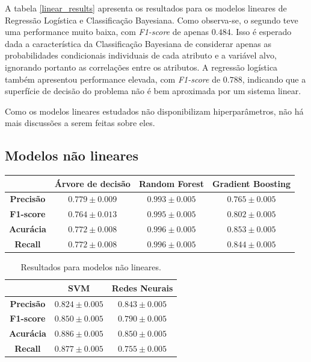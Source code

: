 \documentclass{homework}
\begin{document}
A tabela \ref{linear_results} apresenta os resultados para os modelos lineares de Regressão Logística e Classificação
Bayesiana. Como observa-se, o segundo teve uma performance muito baixa, com \textit{F1-score} de apenas $0.484$.
Isso é esperado dada a característica da Classificação Bayesiana de considerar apenas as probabilidades condicionais
individuais de cada atributo e a variável alvo, ignorando portanto as correlações entre os atributos. A regressão
logística também apresentou performance elevada, com \textit{F1-score} de $0.788$, indicando que a superfície de decisão
do problema não é bem aproximada por um sistema linear.

Como os modelos lineares estudados não disponibilizam hiperparâmetros, não há mais discussões a serem feitas sobre eles.

\subsection{Modelos não lineares}

\begin{table}[h!]
    \centering
    \begin{tabular}{|c|c|c|c|}
        \hline
            & \textbf{Árvore de decisão} & \textbf{Random Forest} & \textbf{Gradient Boosting} \\
        \hline
        \textbf{Precisão} & $0.779 \pm 0.009$ & $0.993 \pm 0.005$ & $0.765 \pm 0.005$ \\
        \hline
        \textbf{F1-score} & $0.764 \pm 0.013$ & $0.995 \pm 0.005$ & $0.802 \pm 0.005$ \\
        \hline
        \textbf{Acurácia} & $0.772 \pm 0.008$ & $0.996 \pm 0.005$ & $0.853 \pm 0.005$ \\
        \hline
        \textbf{Recall} & $0.772 \pm 0.008$ & $0.996 \pm 0.005$ & $0.844 \pm 0.005$ \\
        \hline
    \end{tabular}
\end{table}
\begin{table}[h!]
\centering
    \begin{tabular}{|c|c|c|}
        \hline
            & \textbf{SVM} & \textbf{Redes Neurais} \\
        \hline
        \textbf{Precisão} & $0.824 \pm 0.005$ & $0.843 \pm 0.005$ \\
        \hline
        \textbf{F1-score} & $0.850 \pm 0.005$ & $0.790 \pm 0.005$ \\
        \hline
        \textbf{Acurácia} & $0.886 \pm 0.005$ & $0.850 \pm 0.005$ \\
        \hline
        \textbf{Recall} & $0.877 \pm 0.005$ & $0.755 \pm 0.005$ \\
        \hline
    \end{tabular}
    \caption{Resultados para modelos não lineares.}
    \label{non_linear_results}
\end{table}
\end{document}
